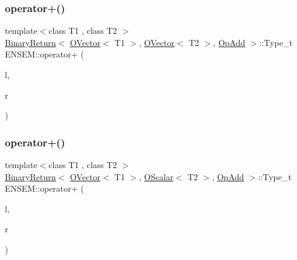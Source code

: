 \mbox{\label{group__obsvector_gab0356c94496b2d6ffd11e6e595df0ea8}} 
\subsubsection{\texorpdfstring{operator+()}{operator+()}\hspace{0.1cm}{\footnotesize\ttfamily [2/4]}}
{\footnotesize\ttfamily template$<$class T1 , class T2 $>$ \\
\mbox{\hyperlink{structENSEM_1_1BinaryReturn}{Binary\+Return}}$<$ \mbox{\hyperlink{classENSEM_1_1OVector}{O\+Vector}}$<$ T1 $>$, \mbox{\hyperlink{classENSEM_1_1OVector}{O\+Vector}}$<$ T2 $>$, \mbox{\hyperlink{structENSEM_1_1OpAdd}{Op\+Add}} $>$\+::Type\+\_\+t E\+N\+S\+E\+M\+::operator+ (\begin{DoxyParamCaption}\item[{const \mbox{\hyperlink{classENSEM_1_1OVector}{O\+Vector}}$<$ T1 $>$ \&}]{l,  }\item[{const \mbox{\hyperlink{classENSEM_1_1OVector}{O\+Vector}}$<$ T2 $>$ \&}]{r }\end{DoxyParamCaption})\hspace{0.3cm}{\ttfamily [inline]}}

\mbox{\label{group__obsvector_gaff6b0407180422eb54c7c31f17d340e3}} 
\subsubsection{\texorpdfstring{operator+()}{operator+()}\hspace{0.1cm}{\footnotesize\ttfamily [3/4]}}
{\footnotesize\ttfamily template$<$class T1 , class T2 $>$ \\
\mbox{\hyperlink{structENSEM_1_1BinaryReturn}{Binary\+Return}}$<$ \mbox{\hyperlink{classENSEM_1_1OVector}{O\+Vector}}$<$ T1 $>$, \mbox{\hyperlink{classENSEM_1_1OScalar}{O\+Scalar}}$<$ T2 $>$, \mbox{\hyperlink{structENSEM_1_1OpAdd}{Op\+Add}} $>$\+::Type\+\_\+t E\+N\+S\+E\+M\+::operator+ (\begin{DoxyParamCaption}\item[{const \mbox{\hyperlink{classENSEM_1_1OVector}{O\+Vector}}$<$ T1 $>$ \&}]{l,  }\item[{const \mbox{\hyperlink{classENSEM_1_1OScalar}{O\+Scalar}}$<$ T2 $>$ \&}]{r }\end{DoxyParamCaption})\hspace{0.3cm}{\ttfamily [inline]}}

